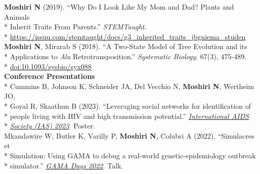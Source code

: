 \documentclass[margin,line]{res}
\begin{document}
\begin{resume}
\hspace*{4mm} \textbf{Moshiri N} (2019). ``Why Do I Look Like My Mom and Dad? Plants and Animals\\*
\hspace*{9mm} Inherit Traits From Parents.'' \textit{STEMTaught}.\\*\vspace{2mm}
\hspace*{8mm} \href{https://issuu.com/stemtaught/docs/g3_inherited_traits_jbgniema_studen}{https://issuu.com/stemtaught/docs/g3\_inherited\_traits\_jbgniema\_studen}\\
\hspace*{4mm} \textbf{Moshiri N}, Mirarab S (2018). ``A Two-State Model of Tree Evolution and its\\*
\hspace*{9mm} Applications to \textit{Alu} Retrotransposition.'' \textit{Systematic Biology}. 67(3), 475-489.\\*\vspace{2mm}
\hspace*{8mm} \href{https://doi.org/10.1093/sysbio/syx088}{doi:10.1093/sysbio/syx088}
~\\
\textbf{Conference Presentations}\vspace{2mm}\\*
\hspace*{4mm} Cummins B, Johnson K, Schneider JA, Del Vecchio N, \textbf{Moshiri N}, Wertheim JO,\\*
\hspace*{9mm} Goyal R, Skaathun B (2023). ``Leveraging social networks for identification of\\*
\hspace*{9mm} people living with HIV and high transmission potential.'' \href{https://www.iasociety.org/conferences/ias2023}{\textit{International AIDS}}\\*\vspace{2mm}
\hspace*{9mm}\href{https://www.iasociety.org/conferences/ias2023}{\textit{Society (IAS) 2023}}. Poster.\\
\hspace*{4mm} Mkandawire W, Butler K, Varilly P, \textbf{Moshiri N}, Colubri A (2022). ``Simulacres et\\*
\hspace*{9mm} Simulation: Using GAMA to debug a real-world genetic-epidemiology outbreak\\*\vspace{2mm}
\hspace*{8mm} simulator.'' \href{https://gama-platform.org/Gama-Days-2022/}{\textit{GAMA Days 2022}}. Talk.\\

\end{resume}
\end{document}
